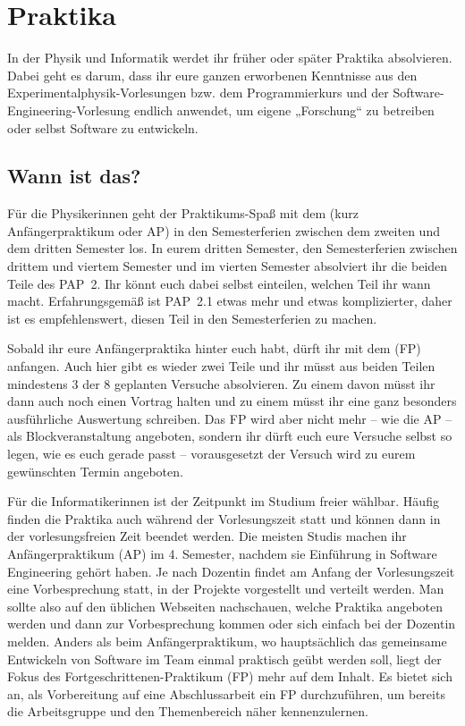 \section{Praktika}

In der Physik und Informatik werdet ihr früher oder später Praktika absolvieren. Dabei geht es darum, dass ihr eure ganzen erworbenen Kenntnisse aus den Experimentalphysik-Vorlesungen bzw. dem Programmierkurs und der Software-Engineering-Vorlesung endlich anwendet, um eigene „Forschung“ zu betreiben oder selbst Software zu entwickeln.

\subsection{Wann ist das?}

Für die Physikerinnen geht der Praktikums-Spaß mit dem  (kurz Anfängerpraktikum oder \gls{AP}) in den Semesterferien zwischen dem zweiten und dem dritten Semester los. In eurem dritten Semester, den Semesterferien zwischen drittem und viertem Semester und im vierten Semester absolviert ihr die beiden Teile des PAP~2. Ihr könnt euch dabei selbst einteilen, welchen Teil ihr wann macht. Erfahrungsgemäß ist PAP~2.1 etwas mehr und etwas komplizierter, daher ist es empfehlenswert, diesen Teil in den Semesterferien zu machen.

Sobald ihr eure Anfängerpraktika hinter euch habt, dürft ihr mit dem  (\gls{FP}) anfangen. Auch hier gibt es wieder zwei Teile und ihr müsst aus beiden Teilen mindestens 3 der 8 geplanten Versuche absolvieren. Zu einem davon müsst ihr dann auch noch einen Vortrag halten und zu einem müsst ihr eine ganz besonders ausführliche Auswertung schreiben. Das \gls{FP} wird aber nicht mehr -- wie die \gls{AP} -- als Blockveranstaltung angeboten, sondern ihr dürft euch eure Versuche selbst so legen, wie es euch gerade passt -- vorausgesetzt der Versuch wird zu eurem gewünschten Termin angeboten.

Für die Informatikerinnen ist der Zeitpunkt im Studium freier wählbar. Häufig finden die Praktika auch während der Vorlesungszeit statt und können dann in der vorlesungsfreien Zeit beendet werden. Die meisten Studis machen ihr Anfängerpraktikum (\gls{AP}) im 4. Semester, nachdem sie Einführung in Software Engineering gehört haben. Je nach Dozentin findet am Anfang der Vorlesungszeit eine Vorbesprechung statt, in der Projekte vorgestellt und verteilt werden. Man sollte also auf den üblichen Webseiten nachschauen, welche Praktika angeboten werden und dann zur Vorbesprechung kommen oder sich einfach bei der Dozentin melden.
Anders als beim Anfängerpraktikum, wo hauptsächlich das gemeinsame Entwickeln von Software im Team einmal praktisch geübt werden soll, liegt der Fokus des Fortgeschrittenen-Praktikum (\gls{FP}) mehr auf dem Inhalt. Es bietet sich an, als Vorbereitung auf eine Abschlussarbeit ein FP durchzuführen, um bereits die Arbeitsgruppe und den Themenbereich näher kennenzulernen.

